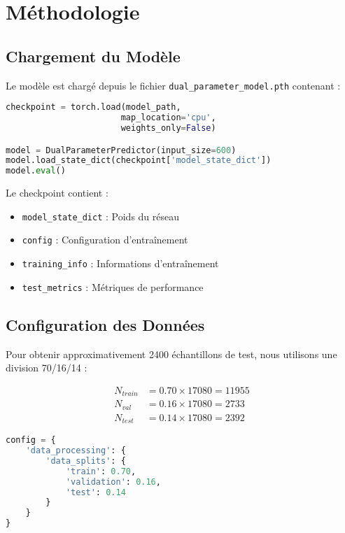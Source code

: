 \documentclass[10pt,twocolumn]{article}
\begin{document}
\section{Méthodologie}

\subsection{Chargement du Modèle}

Le modèle est chargé depuis le fichier \texttt{dual\_parameter\_model.pth} contenant :

\begin{lstlisting}[language=Python, caption=Chargement du modèle]
checkpoint = torch.load(model_path, 
                       map_location='cpu', 
                       weights_only=False)

model = DualParameterPredictor(input_size=600)
model.load_state_dict(checkpoint['model_state_dict'])
model.eval()
\end{lstlisting}

Le checkpoint contient :
\begin{itemize}
    \item \texttt{model\_state\_dict} : Poids du réseau
    \item \texttt{config} : Configuration d'entraînement
    \item \texttt{training\_info} : Informations d'entraînement
    \item \texttt{test\_metrics} : Métriques de performance
\end{itemize}

\subsection{Configuration des Données}

Pour obtenir approximativement 2400 échantillons de test, nous utilisons une division 70/16/14 :

\begin{equation}
\begin{aligned}
N_{train} &= 0.70 \times 17080 = 11955 \\
N_{val} &= 0.16 \times 17080 = 2733 \\
N_{test} &= 0.14 \times 17080 = 2392
\end{aligned}
\end{equation}

\begin{lstlisting}[language=Python, caption=Configuration des splits]
config = {
    'data_processing': {
        'data_splits': {
            'train': 0.70, 
            'validation': 0.16, 
            'test': 0.14
        }
    }
}
\end{lstlisting}
\end{document}
